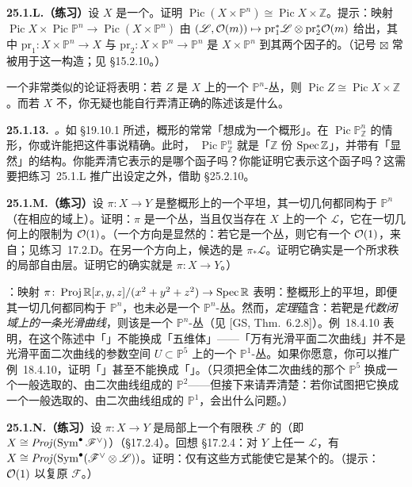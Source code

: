 \textbf{25.1.L.（练习）}\quad 设 $X$ 是一个\trConnected\trNoether{}\trScheme。证明 $\operatorname{Pic}(X\times\mathbb{P}^n)\cong\operatorname{Pic}X\times\mathbb{Z}$。提示：映射 $\operatorname{Pic}X\times\operatorname{Pic}\mathbb{P}^n\to\operatorname{Pic}(X\times\mathbb{P}^n)$ 由 $(\mathscr{L},\mathcal{O}(m))\mapsto\mathrm{pr}_1^*\mathscr{L}\otimes\mathrm{pr}_2^*\mathcal{O}(m)$ 给出，其中 $\mathrm{pr}_1\colon X\times\mathbb{P}^n\to X$ 与 $\mathrm{pr}_2\colon X\times\mathbb{P}^n\to\mathbb{P}^n$ 是 $X\times\mathbb{P}^n$ 到其两个因子的\trProjection。（记号 $\boxtimes$ 常被用于这一构造；见 \S15.2.10。）

一个非常类似的论证将表明：若 $Z$ 是 $X$ 上的一个 $\mathbb{P}^n$-丛，则 $\operatorname{Pic}Z\cong\operatorname{Pic}X\times\mathbb{Z}$。而若 $X$ 不\trConnected，你无疑也能自行弄清正确的陈述该是什么。

\textbf{25.1.13.}\ \emph{\trhRemark{}。}\quad 如 \S19.10.1 所述，概形的\trPicardGroup{}常常「想成为一个概形」。在 $\operatorname{Pic}\mathbb{P}^n_{\mathbb{Z}}$ 的情形，你或许能把这件事说精确。此时，\trScheme{} $\operatorname{Pic}\mathbb{P}^n_{\mathbb{Z}}$ 就是「$\mathbb{Z}$ 份 $\operatorname{Spec}\mathbb{Z}$」，并带有「显然」的\trGroupScheme{}结构。你能弄清它表示的是哪个函子吗？你能证明它表示这个函子吗？这需要把\mbox{练习~25.1.L} 推广出\trNoether{}设定之外，借助 \S25.2.10。

\textbf{25.1.M.（练习）}\quad 设 $\pi\colon X\to Y$ 是\trNoether{}整概形上的一个\trProjective{}平坦\trMorphism，其一切几何\trFiber{}都同构于 $\mathbb{P}^n$（在相应的域上）。证明：$\pi$ 是一个\trProjective{}丛，当且仅当存在 $X$ 上的一个\trInvertibleSheaf{} $\mathscr{L}$，它在一切几何\trFiber{}上的限制为 $\mathcal{O}(1)$。（一个方向是显然的：若它是一个\trProjective{}丛，则它有一个 $\mathcal{O}(1)$，来自\trProjectivization；见\mbox{练习~17.2.D}。在另一个方向上，候选的\trVectorBundle{}是 $\pi_*\mathscr{L}$。证明它确实是一个所求秩的局部自由层。证明它的\trProjectivization{}确实就是 $\pi\colon X\to Y$。）

\trhCaveat：映射 $\pi\colon\operatorname{Proj}\mathbb{R}[x,y,z]/(x^{2}+y^{2}+z^{2})\to\operatorname{Spec}\mathbb{R}$ 表明：\trNoether{}整概形上的\trProjective{}平坦\trMorphism，即便其一切几何\trFiber{}都同构于 $\mathbb{P}^n$，也未必是一个 $\mathbb{P}^n$-丛。然而，\emph{\trTsen{}定理}蕴含：若靶是\emph{代数闭域上的一条光滑曲线}，则该\trMorphism{}是一个 $\mathbb{P}^n$-丛（见 [GS, Thm.~6.2.8]）。\mbox{例~18.4.10} 表明，在这个陈述中「\trCurve」不能换成「五维体」——「万有光滑平面二次曲线」并不是光滑平面二次曲线的参数空间 $U\subset\mathbb{P}^5$ 上的一个 $\mathbb{P}^1$-丛。如果你愿意，你可以推广\mbox{例~18.4.10}，证明「\trCurve」甚至不能换成「\trSurface」。（只须把全体二次曲线的那个 $\mathbb{P}^5$ 换成一个一般选取的、由二次曲线组成的 $\mathbb{P}^2$——但接下来请弄清楚：若你试图把它换成一个一般选取的、由二次曲线组成的 $\mathbb{P}^1$，会出什么问题。）

\textbf{25.1.N.（练习）}\quad 设 $\pi\colon X\to Y$ 是局部\trNoether{}\trScheme{}上一个有限秩\trLocallyFreeSheaf{} $\mathscr{F}$ 的\trProjectivization（即 $X\cong\mathit{Proj}(\operatorname{Sym}^\bullet\mathscr{F}^{\vee})$）（\S17.2.4）。回想 \S17.2.4：对 $Y$ 上任一\trInvertibleSheaf{} $\mathscr{L}$，有 $X\cong\mathit{Proj}(\operatorname{Sym}^\bullet(\mathscr{F}^{\vee}\otimes\mathscr{L}))$。证明：仅有这些方式能使它是某个\trVectorBundle{}的\trProjectivization。（提示：\trPushforward{} $\mathcal{O}(1)$ 以复原 $\mathscr{F}$。）
